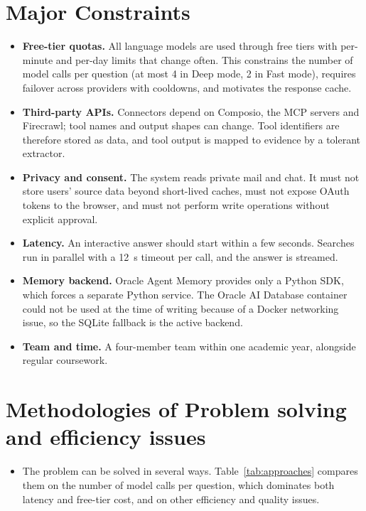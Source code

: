 \documentclass[oneside,a4paper,12pt]{report}
\begin{document}
\section{Major Constraints}
\begin{itemize}
\item \textbf{Free-tier quotas.} All language models are used through free tiers with per-minute and per-day limits that change often. This constrains the number of model calls per question (at most 4 in Deep mode, 2 in Fast mode), requires failover across providers with cooldowns, and motivates the response cache.
\item \textbf{Third-party APIs.} Connectors depend on Composio, the MCP servers and Firecrawl; tool names and output shapes can change. Tool identifiers are therefore stored as data, and tool output is mapped to evidence by a tolerant extractor.
\item \textbf{Privacy and consent.} The system reads private mail and chat. It must not store users' source data beyond short-lived caches, must not expose OAuth tokens to the browser, and must not perform write operations without explicit approval.
\item \textbf{Latency.} An interactive answer should start within a few seconds. Searches run in parallel with a 12~s timeout per call, and the answer is streamed.
\item \textbf{Memory backend.} Oracle Agent Memory provides only a Python SDK, which forces a separate Python service. The Oracle AI Database container could not be used at the time of writing because of a Docker networking issue, so the SQLite fallback is the active backend.
\item \textbf{Team and time.} A four-member team within one academic year, alongside regular coursework.
\end{itemize}

\section{Methodologies of Problem solving and efficiency issues}
\begin{itemize}
	\item The problem can be solved in several ways. Table~\ref{tab:approaches} compares them on the number of model calls per question, which dominates both latency and free-tier cost, and on other efficiency and quality issues.
\end{itemize}
\end{document}
